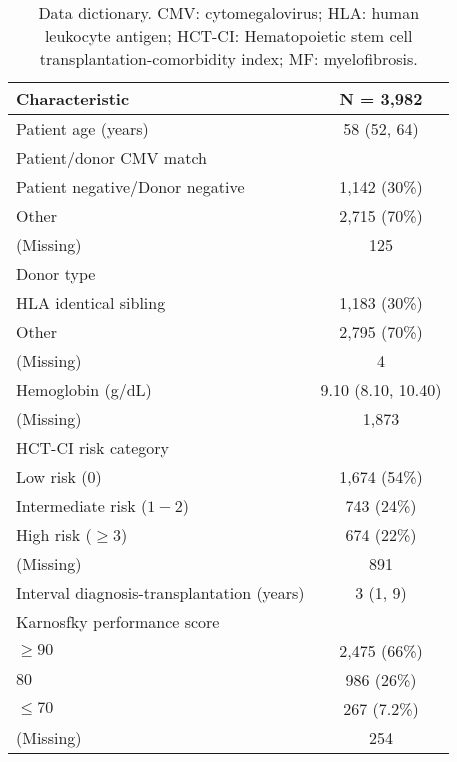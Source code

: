 \documentclass[
  12pt,
  a4paper,
]{article}
\begin{document}
\begin{longtable}[t]{lc}
\caption{Data dictionary. CMV: cytomegalovirus; HLA: human leukocyte antigen; HCT-CI: Hematopoietic stem cell transplantation-comorbidity index; MF: myelofibrosis.}\\
\toprule
Characteristic & N = 3,982\\
\midrule
Patient age (years) & 58 (52, 64)\\
Patient/donor CMV match & \\
\hspace{1em}Patient negative/Donor negative & 1,142 (30\%)\\
\hspace{1em}Other & 2,715 (70\%)\\
\hspace{1em}(Missing) & 125\\
Donor type & \\
\hspace{1em}HLA identical sibling & 1,183 (30\%)\\
\hspace{1em}Other & 2,795 (70\%)\\
\hspace{1em}(Missing) & 4\\
Hemoglobin (g/dL) & 9.10 (8.10, 10.40)\\
\hspace{1em}(Missing) & 1,873\\
HCT-CI risk category & \\
\hspace{1em}Low risk ($0$) & 1,674 (54\%)\\
\hspace{1em}Intermediate risk ($1-2$) & 743 (24\%)\\
\hspace{1em}High risk ($\geq 3$) & 674 (22\%)\\
\hspace{1em}(Missing) & 891\\
Interval diagnosis-transplantation (years) & 3 (1, 9)\\
Karnosfky performance score & \\
\hspace{1em}$\geq 90$ & 2,475 (66\%)\\
\hspace{1em}$80$ & 986 (26\%)\\
\hspace{1em}$\leq 70$ & 267 (7.2\%)\\
\hspace{1em}(Missing) & 254\\

\end{longtable}
\end{document}
